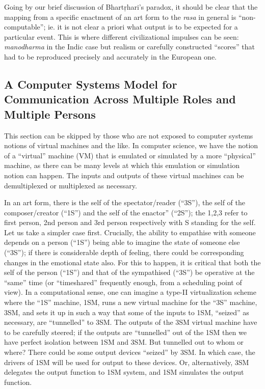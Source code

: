 Going by our brief discussion of Bhartṛhari’s paradox, it should be clear that the mapping from a specific enactment of an art form to the \textsl{rasa} in general is “non-computable”; ie. it is not clear a priori what output is to be expected for a particular event. This is where different civilizational impulses can be seen: \textsl{manodharma} in the Indic case but realism or carefully constructed “scores” that had to be reproduced precisely and accurately in the European one. 

\subsection{A Computer Systems Model for Communication Across Multiple Roles and Multiple Persons}\label{chap3-sec4.2}

This section can be skipped by those who are not exposed to computer systems notions of virtual machines and the like. In computer science, we have the notion of a “virtual” machine (VM) that is emulated or simulated by a more “physical” machine, as there can be many levels at which this emulation or simulation notion can happen. The inputs and outputs of these virtual machines can be demultiplexed or multiplexed as necessary.

In an art form, there is the self of the spectator/reader (“3S”), the self of the composer/creator (“1S”) and the self of the enactor” (“2S”); the 1,2,3 refer to first person, 2nd person and 3rd person respectively with S standing for the self. Let us take a simpler case first. Crucially, the ability to empathise with someone depends on a person (“1S”) being able to imagine the state of someone else (“3S”); if there is considerable depth of feeling, there could be corresponding changes in the emotional state also. For this to happen, it is critical that both the self of the person (“1S”) and that of the sympathised (“3S”) be operative at the “same” time (or “timeshared” frequently enough, from a scheduling point of view). In a computational sense, one can imagine a type-II virtualization scheme where the “1S” machine, 1SM, runs a new virtual machine for the “3S” machine, 3SM, and sets it up in such a way that some of the inputs to 1SM, “seized” as necessary, are “tunnelled” to 3SM. The outputs of the 3SM virtual machine have to be carefully steered; if the outputs are “tunnelled” out of the 1SM then we have perfect isolation between 1SM and 3SM. But tunnelled out to whom or where? There could be some output devices “seized” by 3SM. In which case, the drivers of 1SM will be used for output to these devices. Or, alternatively, 3SM delegates the output function to 1SM system, and 1SM simulates the output function.

